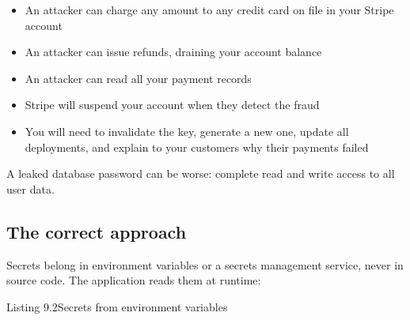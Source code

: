 \begin{itemize}
\tightlist
\item
  An attacker can charge any amount to any credit card on file in your Stripe account
\item
  An attacker can issue refunds, draining your account balance
\item
  An attacker can read all your payment records
\item
  Stripe will suspend your account when they detect the fraud
\item
  You will need to invalidate the key, generate a new one, update all deployments, and explain to your customers why their payments failed
\end{itemize}

\noindent{}A leaked database password can be worse: complete read and write access to all user data.

\subsection*{The correct approach}\label{09-configuration-coupling:the-correct-approach}

Secrets belong in environment variables or a secrets management service, never in source code. The application reads them at runtime:

\begin{codeboxcap}[short]{\textcolor{accent}{Listing 9.2}\enspace Secrets from environment variables}

\begin{Shaded}
\begin{Highlighting}[]

\OperatorTok{=}\NormalTok{)}

\NormalTok{app.config[}\NormalTok{] }\OperatorTok{=}\NormalTok{ os.environ[}\NormalTok{]  }
\OperatorTok{=}\NormalTok{ os.environ[}\NormalTok{]             }
\OperatorTok{=}\NormalTok{)          }

 
     \NormalTok{(}\NormalTok{)}
\end{Highlighting}
\end{Shaded}

\end{codeboxcap}


